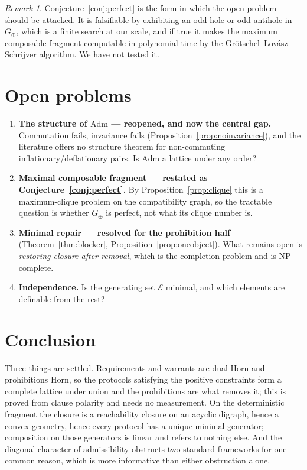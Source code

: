 \documentclass[11pt]{article}
\theoremstyle{definition}
\theoremstyle{plain}
\theoremstyle{remark}
\newtheorem{remark}[definition]{Remark}
\newcommand{\Adm}{\mathrm{Adm}}
\newcommand{\El}{\mathcal{E}}
\begin{document}
\begin{remark}
Conjecture~\ref{conj:perfect} is the form in which the open problem should be
attacked. It is falsifiable by exhibiting an odd hole or odd antihole in
$G_\oplus$, which is a finite search at our scale, and if true it makes the
maximum composable fragment computable in polynomial time by the
Gr\"otschel--Lov\'asz--Schrijver algorithm. We have not tested it.
\end{remark}

\section{Open problems}

\begin{enumerate}
  \item \textbf{The structure of $\Adm$ --- reopened, and now the central gap.}
    Commutation fails, invariance fails (Proposition~\ref{prop:noinvariance}),
    and the literature offers no structure theorem for non-commuting
    inflationary/deflationary pairs. Is $\Adm$ a lattice under any order?
  \item \textbf{Maximal composable fragment --- restated as
    Conjecture~\ref{conj:perfect}.} By Proposition~\ref{prop:clique} this is a
    maximum-clique problem on the compatibility graph, so the tractable question
    is whether $G_\oplus$ is perfect, not what its clique number is.
  \item \textbf{Minimal repair --- resolved for the prohibition half}
    (Theorem~\ref{thm:blocker}, Proposition~\ref{prop:oneobject}). What remains
    open is \emph{restoring closure after removal}, which is the completion
    problem and is NP-complete.
  \item \textbf{Independence.} Is the generating set $\El$ minimal, and which
    elements are definable from the rest?
\end{enumerate}

\section{Conclusion}

Three things are settled. Requirements and warrants are dual-Horn and
prohibitions Horn, so the protocols satisfying the positive constraints form a
complete lattice under union and the prohibitions are what removes it; this is
proved from clause polarity and needs no measurement. On the deterministic
fragment the closure is a reachability closure on an acyclic digraph, hence a
convex geometry, hence every protocol has a unique minimal generator; composition
on those generators is linear and refers to nothing else. And the diagonal
character of admissibility obstructs two standard frameworks for one common
reason, which is more informative than either obstruction alone.
\end{document}
